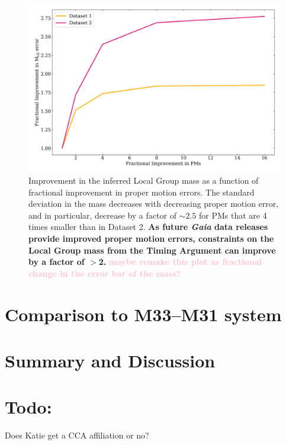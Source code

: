 \documentclass[twocolumn]{aastex631}
\newcommand{\kc}[1]{\textcolor{pink}{\textbf{#1}} }
\begin{document}
\begin{figure}[htb]
    \centering
    \includegraphics[width=\columnwidth]{analyze-runs-deltaMvsPM.png}
    \caption{\label{fig:mvspm} Improvement in the inferred Local Group mass as a function of fractional improvement in proper motion errors. The standard deviation in the mass decreases with decreasing proper motion error, and in particular, decrease by a factor of $\sim2.5$ for PMs that are 4 times smaller than in Dataset 2. \textbf{As future \textit{Gaia} data releases provide improved proper motion errors, constraints on the Local Group mass from the Timing Argument can improve by a factor of $>$2.} \kc{maybe remake this plot as fractional change in the error bar of the mass?}
    }
\end{figure}


\section{Comparison to M33--M31 system}

\section{Summary and Discussion}
\label{sec:discussion}


\appendix
\section{Todo:}
Does Katie get a CCA affiliation or no?

{}

\end{document}
